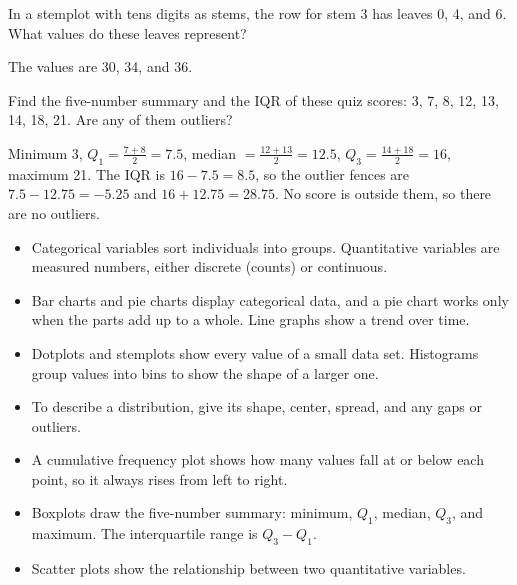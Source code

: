 \begin{Exercise}[label=dviz2, title=Reading a stemplot]
In a stemplot with tens digits as stems, the row for stem 3 has leaves 0, 4, and 6. What values do these leaves represent?
\end{Exercise}
\begin{Answer}[ref=dviz2]
The values are 30, 34, and 36.
\end{Answer}

\begin{Exercise}[label=dviz3, title=Five-number summary]
Find the five-number summary and the IQR of these quiz scores: 3, 7, 8, 12, 13, 14, 18, 21. Are any of them outliers?
\end{Exercise}
\begin{Answer}[ref=dviz3]
Minimum 3, $Q_1 = \frac{7+8}{2} = 7.5$, median $= \frac{12+13}{2} = 12.5$, $Q_3 = \frac{14+18}{2} = 16$, maximum 21. The IQR is $16 - 7.5 = 8.5$, so the outlier fences are $7.5 - 12.75 = -5.25$ and $16 + 12.75 = 28.75$. No score is outside them, so there are no outliers.
\end{Answer}

\begin{mdframed}[style=important, frametitle={Key Ideas}]
\begin{itemize}
\item Categorical variables sort individuals into groups. Quantitative variables are measured numbers, either discrete (counts) or continuous.
\item Bar charts and pie charts display categorical data, and a pie chart works only when the parts add up to a whole. Line graphs show a trend over time.
\item Dotplots and stemplots show every value of a small data set. Histograms group values into bins to show the shape of a larger one.
\item To describe a distribution, give its shape, center, spread, and any gaps or outliers.
\item A cumulative frequency plot shows how many values fall at or below each point, so it always rises from left to right.
\item Boxplots draw the five-number summary: minimum, $Q_1$, median, $Q_3$, and maximum. The interquartile range is $Q_3 - Q_1$.
\item Scatter plots show the relationship between two quantitative variables.
\end{itemize}
\end{mdframed}
